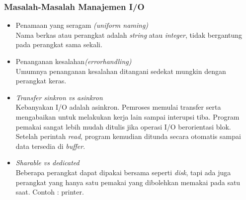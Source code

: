 \documentclass[12pt]{article}
\begin{document}
\subsubsection{Masalah-Masalah Manajemen I/O}
\begin{itemize}
    \item Penamaan yang seragam \textit{(uniform naming)} \\
    Nama berkas atau perangkat adalah \textit{string} atau \textit{integer}, tidak bergantung pada perangkat sama sekali. 
    \item Penanganan kesalahan\textit{(errorhandling)}\\
    Umumnya penanganan kesalahan ditangani sedekat mungkin dengan perangkat keras.
    \item \textit{Transfer sinkron vs asinkron} \\
    Kebanyakan I/O adalah asinkron. Pemroses memulai transfer serta mengabaikan untuk melakukan kerja lain sampai interupsi tiba. Program pemakai sangat lebih mudah ditulis jika operasi I/O berorientasi blok. Setelah perintah \textit{read}, program kemudian ditunda secara otomatis sampai data tersedia di \textit{buffer}.
    \item \textit{Sharable vs dedicated} \\
    Beberapa perangkat dapat dipakai bersama seperti \textit{disk}, tapi ada juga perangkat yang hanya satu pemakai yang dibolehkan memakai pada satu saat. Contoh : printer.
\end{itemize}
\end{document}
